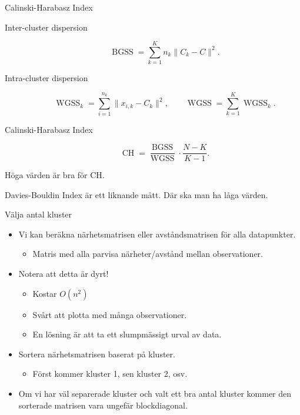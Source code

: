 \documentclass[10pt,english]{beamer}
\begin{document}
\begin{frame}{Calinski-Harabasz Index}
    \begin{description}
        \item[Inter-cluster dispersion]
        \begin{equation*}
            \operatorname{BGSS} = \sum_{k=1}^{K} n_k \| C_k - C \|^2.
        \end{equation*}
        \item[Intra-cluster dispersion]
        \begin{equation*}
            \operatorname{WGSS}_k = \sum_{i=1}^{n_k} \| x_{i,k} - C_k \|^2, \qquad \operatorname{WGSS} = \sum_{k=1}^{K} \operatorname{WGSS}_k.
        \end{equation*}
        \item[Calinski-Harabasz Index]
        \begin{equation*}
            \operatorname{CH} = \frac{\operatorname{BGSS}}{\operatorname{WGSS}} \cdot \frac{N - K}{K-1}.
        \end{equation*}
    \end{description}
    Höga värden är bra för CH.

    Davies-Bouldin Index är ett liknande mått. Där ska man ha låga värden.
\end{frame}

\begin{frame}{Välja antal kluster}

    \begin{itemize}
        \item Vi kan beräkna närhetsmatrisen eller avståndsmatrisen för alla datapunkter.
        \begin{itemize}
            \item Matris med alla parvisa närheter/avstånd mellan observationer.
        \end{itemize}
        \item Notera att detta är dyrt!
        \begin{itemize}
            \item Kostar $O(n^2)$
            \item Svårt att plotta med många observationer.
            \item En lösning är att ta ett slumpmässigt urval av data.
        \end{itemize}
        \item Sortera närhetsmatrisen baserat på kluster.
        \begin{itemize}
            \item Först kommer kluster 1, sen kluster 2, osv.
        \end{itemize}
        \item Om vi har väl separerade kluster och valt ett bra antal kluster kommer den sorterade matrisen vara ungefär blockdiagonal.
    \end{itemize}
    
\end{frame}
\end{document}
